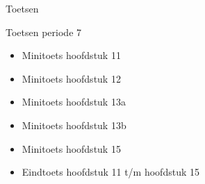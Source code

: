 \begin{frame}{Toetsen}

\begin{block}{Toetsen periode 7}
\begin{itemize}
 \item Minitoets hoofdstuk 11
 \item Minitoets hoofdstuk 12
 \item Minitoets hoofdstuk 13a
 \item Minitoets hoofdstuk 13b
 \item Minitoets hoofdstuk 15
 \item Eindtoets hoofdstuk 11 t/m hoofdstuk 15
 \end{itemize}
\end{block}
\end{frame}
